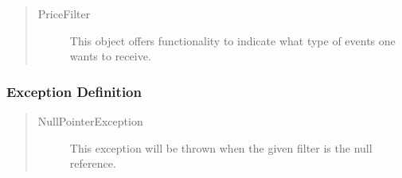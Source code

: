 \begin{quote}
	\begin{description}
		\item[PriceFilter] This object offers functionality to indicate what
		type of events one wants to receive.
	\end{description} 
\end{quote}

\subsubsection{Exception Definition} 

\begin{quote}
	\begin{description}
		\item[NullPointerException] This exception will be thrown when the given
		filter is the null reference.
	\end{description} 
\end{quote}

